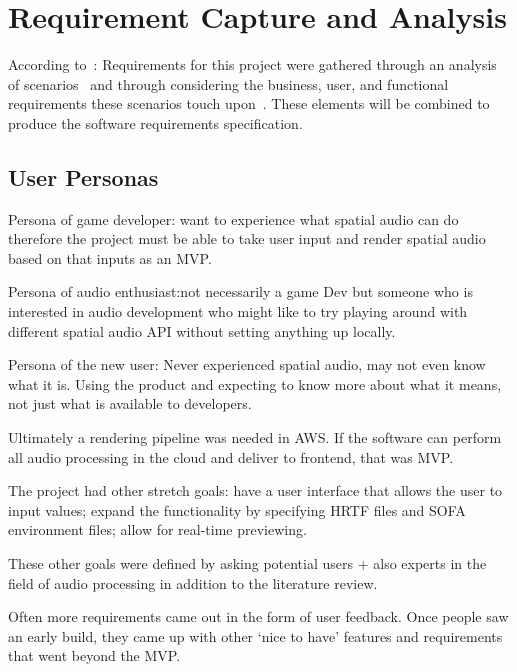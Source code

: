 \thispagestyle{plain}
\newpage
\section{Requirement Capture and Analysis}\label{sec:requirement-capture}

\normalsize

According to~\citet{anton2003successful}: 
Requirements for this project were gathered through an analysis of scenarios~\citep{potts1994inquiry} and through considering the business, user, and functional requirements these scenarios touch upon~\citep{wiegers2000karl}.
These elements will be combined to produce the software requirements specification.


\subsection{User Personas}

Persona of game developer:
want to experience what spatial audio can do therefore the project must be able
to take user input and render spatial audio based on that inputs as an MVP.

Persona of audio enthusiast:not necessarily a game Dev but someone who is interested in audio development who might like to try playing around with different spatial audio API without setting anything up locally.

Persona of the new user: Never experienced spatial audio, may not even know what it is.
Using the product and expecting to know more about what it means, not just what is available to developers.

Ultimately a rendering pipeline was needed in AWS. If the software can perform all audio processing in the cloud and deliver to frontend, that was MVP.

The project had other stretch goals: have a user interface that allows the user to input values; expand the functionality by specifying HRTF files and SOFA environment files; allow for real-time previewing.

These other goals were defined
by asking potential users + also experts in the field of audio processing in addition to the literature review.

Often more requirements came out in the form of user feedback.
Once people saw an early build, they came up with other `nice to have' features and requirements that went beyond the MVP\@.

